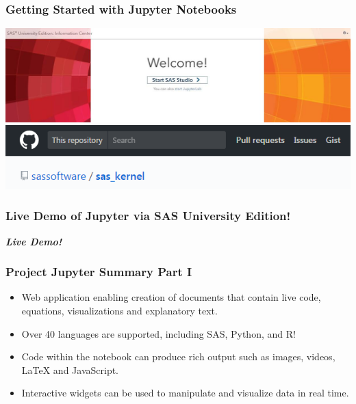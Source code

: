 \documentclass[xcolor={dvipsnames}]{beamer}
\newcommand{\ft}{\frametitle}
\newcommand{\bi}{\begin{itemize}}
\newcommand{\ei}{\end{itemize}}
\begin{document}
\begin{frame}
\ft{Getting Started with Jupyter Notebooks}
\begin{center}
	\includegraphics[width = .75\textwidth]{SASStudio-JupyterLab.jpg} \\ \vspace{.5in}
	\includegraphics[width = .75\textwidth]{SASKernel-GitHub-Header.PNG}
\end{center}
\end{frame}

\begin{frame}
\ft{Live Demo of Jupyter via SAS University Edition!}
\begin{center}
	\textbf{\emph{Live Demo!}}
\end{center}
\end{frame}

\begin{frame}
\ft{Project Jupyter Summary Part I}
\bi
	\item Web application enabling creation of documents that contain live code, equations, visualizations and explanatory text.
	\item Over 40 languages are supported, including SAS, Python, and R!
	\item Code within the notebook can produce rich output such as images, videos, LaTeX and JavaScript.
	\item Interactive widgets can be used to manipulate and visualize data in real time.
\ei
\end{frame}
\end{document}

